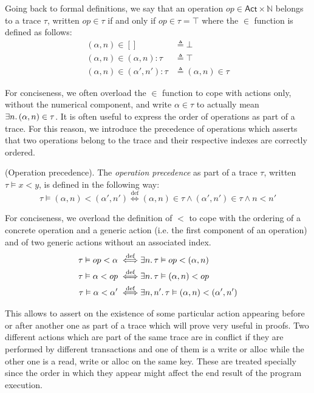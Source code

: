 Going back to formal definitions, we say that an operation $op \in \mathsf{Act} \times \mathds{N}$ belongs to a trace $\tau$, written $op \in \tau$ if and only if $op \in \tau = \top$ where the $\in$ function is defined as follows:
\begin{align*}
	(\alpha, n) \in [] &\triangleq \bot \\
	(\alpha, n) \in (\alpha, n):\tau &\triangleq \top \\
	(\alpha, n) \in (\alpha', n'):\tau &\triangleq (\alpha, n) \in \tau
\end{align*}

For conciseness, we often overload the $\in$ function to cope with actions only, without the numerical component, and write $\alpha \in \tau$ to actually mean $\exists n \ldotp (\alpha, n) \in \tau$. It is often useful to express the order of operations as part of a trace. For this reason, we introduce the precedence of operations which asserts that two operations belong to the trace and their respective indexes are correctly ordered.
\begin{defn}
	(Operation precedence).
	The \emph{operation precedence} as part of a trace $\tau$, written $\tau \vDash x < y$, is defined in the following way:
	\[
		\tau \vDash (\alpha, n) < (\alpha', n') \overset{\text{def}}{\iff}
(\alpha, n) \in \tau \land (\alpha', n') \in \tau \land n < n'
	\]
\end{defn}

For conciseness, we overload the definition of $<$ to cope with the ordering of a concrete operation and a generic action (i.e. the first component of an operation) and of two generic actions without an associated index.
\begin{align*}
	\tau \vDash op < \alpha \overset{\text{def}}{\iff}&
	\exists n \ldotp \tau \vDash op < (\alpha, n)
		\\
	\tau \vDash \alpha < op \overset{\text{def}}{\iff}&
	\exists n \ldotp \tau \vDash (\alpha, n) < op
		\\
	\tau \vDash \alpha < \alpha' \overset{\text{def}}{\iff}&
	\exists n, n' \ldotp \tau \vDash (\alpha, n) < (\alpha', n')
\end{align*}

This allows to assert on the existence of some particular action appearing before or after another one as part of a trace which will prove very useful in proofs. Two different actions which are part of the same trace are in conflict if they are performed by different transactions and one of them is a write or alloc while the other one is a read, write or alloc on the same key. These are treated specially since the order in which they appear might affect the end result of the program execution.

